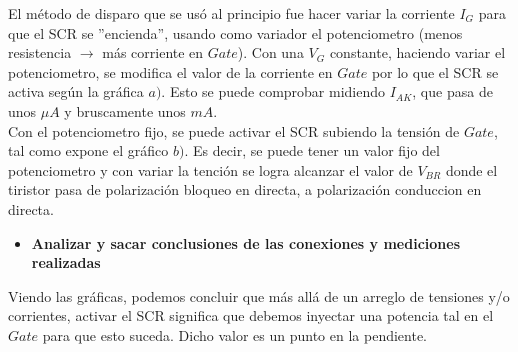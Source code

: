 \sangria{} El método de disparo que se usó al principio fue hacer variar la corriente $I_G$ para que el SCR se ''encienda'', usando como variador el potenciometro (menos resistencia $\rightarrow$ más corriente en $Gate$).
\sangria{} Con una $V_G$ constante, haciendo variar el potenciometro, se modifica el valor de la corriente en $Gate$ por lo que el SCR se activa según la gráfica $a)$. Esto se puede comprobar midiendo $I_{AK}$, que pasa de unos $\mu A$ y bruscamente unos $mA$. \\
\sangria{} Con el potenciometro fijo, se puede activar el SCR subiendo la tensión de $Gate$, tal como expone el gráfico $b)$. Es decir, se puede tener un valor fijo del potenciometro y con variar la tención se logra alcanzar el valor de $V_{BR}$ donde el tiristor pasa de polarización bloqueo en directa, a polarización conduccion en directa.
\begin{itemize}
\item \textbf{Analizar y sacar conclusiones de las conexiones y mediciones realizadas}
\end{itemize}
\sangria{} Viendo las gráficas, podemos concluir que más allá de un arreglo de tensiones y/o corrientes, activar el SCR significa que debemos inyectar una potencia tal en el $Gate$ para que esto suceda. Dicho valor es un punto en la pendiente.


